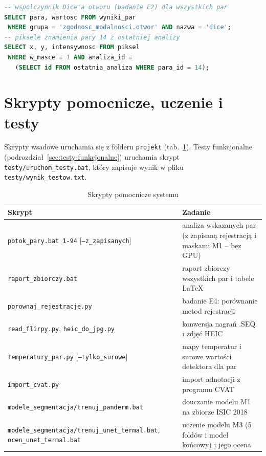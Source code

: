 \begin{lstlisting}[language=SQL, caption={Przykładowe zapytania do bazy danych}, label={lst:sql}]
-- wspolczynnik Dice'a otworu (badanie E2) dla wszystkich par
SELECT para, wartosc FROM wyniki_par
 WHERE grupa = 'zgodnosc_modalnosci.otwor' AND nazwa = 'dice';
-- piksele znamienia pary 14 z ostatniej analizy
SELECT x, y, intensywnosc FROM piksel
 WHERE w_masce = 1 AND analiza_id =
   (SELECT id FROM ostatnia_analiza WHERE para_id = 14);
\end{lstlisting}

\section{Skrypty pomocnicze, uczenie i testy}

Skrypty wsadowe uruchamia się z folderu \texttt{projekt} (tab.~\ref{tab:skrypty}). Testy funkcjonalne (podrozdział~\ref{sec:testy-funkcjonalne}) uruchamia skrypt \texttt{testy/uruchom\_testy.bat}, który zapisuje wynik w pliku \texttt{testy/wynik\_testow.txt}.

\begin{table}[!ht]
  \centering
  \caption{Skrypty pomocnicze systemu}
  \label{tab:skrypty}
  \footnotesize
  \begin{tabularx}{\textwidth}{>{\raggedright\arraybackslash}p{5.0cm} X}
    \toprule
    Skrypt & Zadanie \\
    \midrule
    \texttt{potok\_pary.bat 1-94} [\texttt{--z\_zapisanych}] & analiza wskazanych par (z zapisaną rejestracją i maskami M1 -- bez GPU) \\
    \texttt{raport\_zbiorczy.bat} & raport zbiorczy wszystkich par i tabele \LaTeX{} \\
    \texttt{porownaj\_rejestracje.py} & badanie E4: porównanie metod rejestracji \\
    \texttt{read\_flirpy.py}, \texttt{heic\_do\_jpg.py} & konwersja nagrań .SEQ i zdjęć HEIC \\
    \texttt{temperatury\_par.py} [\texttt{--tylko\_surowe}] & mapy temperatur i surowe wartości detektora dla par \\
    \texttt{import\_cvat.py} & import adnotacji z programu CVAT \\
    \texttt{modele\_segmentacja/trenuj\_panderm.bat} & douczanie modelu M1 na zbiorze ISIC 2018 \\
    \texttt{modele\_segmentacja/trenuj\_unet\_termal.bat}, \texttt{ocen\_unet\_termal.bat} & uczenie modelu M3 (5 foldów i model końcowy) i jego ocena \\
    \bottomrule
  \end{tabularx}
\end{table}


